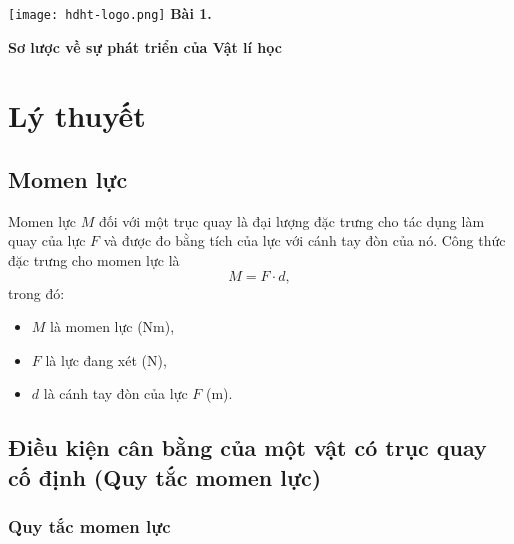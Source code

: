 \newcommand{\chapter}[2][]{
	\newcommand{\chapname}{#2}
	\begin{flushleft}
		\begin{minipage}[t]{\linewidth}
			\texttt{[image: hdht-logo.png]}
			\hspace{0pt}	
			\sffamily\bfseries\large Bài 1.
			\begin{flushleft}
				\huge\bfseries #1
			\end{flushleft}
		\end{minipage}
	\end{flushleft}
	\vspace{1cm}
	\normalfont\normalsize
}
\chapter[Sơ lược về sự phát triển của Vật lí học]{Sơ lược về sự phát triển của Vật lí học}
\section{Lý thuyết}

\subsection{Momen lực}
Momen lực $M$ đối với một trục quay là đại lượng đặc trưng cho tác dụng làm quay của lực $F$ và được đo bằng tích của lực với cánh tay đòn của nó. Công thức đặc trưng cho momen lực là 
\begin{equation*}
	M = F\cdot d, \label{eq1}
\end{equation*}
trong đó: 
\begin{itemize}
	\item $M$ là momen lực ($\textrm{Nm}$), 
	\item $F$ là lực đang xét ($\textrm{N}$),
	\item $d$ là cánh tay đòn của lực $F$ ($\textrm{m}$).
\end{itemize}
\subsection{Điều kiện cân bằng của một vật có trục quay cố định (Quy tắc momen lực)}
\subsubsection{Quy tắc momen lực}

